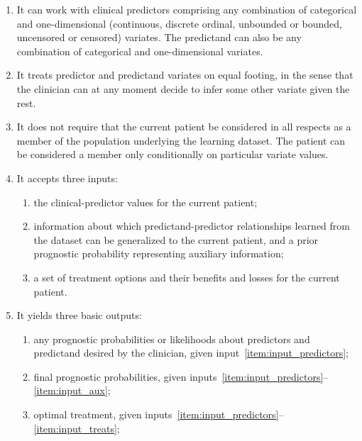 \documentclass[utf8]{FrontiersinHarvard} %
\renewcommand*{\|}[1][]{\nonscript\:#1\vert\nonscript\:\mathopen{}}
\begin{document}
\begin{enumerate}
\item\label{item:feat_variates} It can work with clinical predictors comprising any combination of categorical and one-dimensional (continuous, discrete ordinal, unbounded or bounded, uncensored or censored) variates. The predictand can also be any combination of categorical and one-dimensional variates.

\item\label{item:feat_indifferentvariates} It treats predictor and predictand variates on equal footing, in the sense that the clinician can at any moment decide to infer some other variate given the rest.
\item\label{item:feat_conditionalstats} It does not require that the current patient be considered in all respects as a member of the population underlying the learning dataset. The patient can be considered a member only conditionally on particular variate values.
  
\item\label{item:feat_inputs} It accepts three inputs:
  \begin{enumerate}
  \item\label{item:input_predictors} the clinical-predictor values for the current patient;
  \item\label{item:input_aux} information about which predictand-predictor relationships learned from the dataset can be generalized to the current patient, and a prior prognostic probability representing auxiliary information;
  \item\label{item:input_treats} a set of treatment options and their benefits and losses for the current patient.
  \end{enumerate}

\item\label{item:feat_outputs} It yields three basic outputs:
  \begin{enumerate}
  \item\label{item:ouput_predictors} any prognostic probabilities or likelihoods about predictors and predictand desired by the clinician, given input~\ref{item:input_predictors};
  \item\label{item:output_aux} final prognostic probabilities, given inputs~\ref{item:input_predictors}--\ref{item:input_aux};
  \item\label{item:output_treats} optimal treatment, given inputs~\ref{item:input_predictors}--\ref{item:input_treats};
  \end{enumerate}
  

\end{enumerate}
\end{document}
